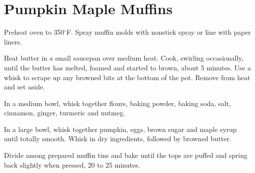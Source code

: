 \section{Pumpkin Maple Muffins}
\begin{recipe}



	Preheat oven to 350$^{\circ}$F. Spray muffin molds with nonstick spray or line with paper liners.

	Heat butter in a small saucepan over medium heat. Cook, swirling occasionally, until the butter has melted, foamed and started to brown, about 5 minutes. Use a whisk to scrape up any browned bits at the bottom of the pot. Remove from heat and set aside.

	In a medium bowl, whisk together flours, baking powder, baking soda, salt, cinnamon, ginger, turmeric and nutmeg.

	In a large bowl, whisk together pumpkin, eggs, brown sugar and maple syrup until totally smooth. Whisk in dry ingredients, followed by browned butter.

	Divide among prepared muffin tins and bake until the tops are puffed and spring back slightly when pressed, 20 to 25 minutes.

\end{recipe}
